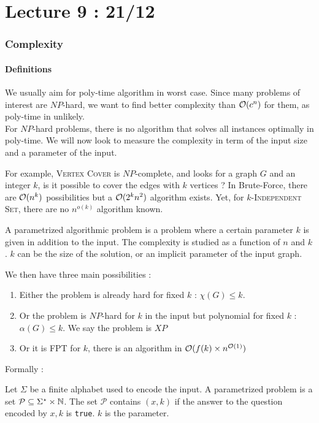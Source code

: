 \documentclass[12pt]{cours}
\begin{document}
\part[Parametrized Complexity]{Lecture 9 : 21/12}
\section{Complexity}
\subsection{Definitions}
We usually aim for poly-time algorithm in worst case. Since many problems of interest are $NP$-hard, we want to find better complexity than $\mathcal{O}(c^{n})$ for them, as poly-time in unlikely. \\
For $NP$-hard problems, there is no algorithm that solves all instances optimally in poly-time. We will now look to measure the complexity in term of the input size and a parameter of the input.

For example, \textsc{Vertex Cover} is $NP$-complete, and looks for a graph $G$ and an integer $k$, is it possible to cover the edges with $k$ vertices ? In Brute-Force, there are $\mathcal{O}(n^{k})$ possibilities but a $\mathcal{O}(2^{k}n^{2})$ algorithm exists. Yet, for $k$-\textsc{Independent Set}, there are no $n^{o(k)}$ algorithm known.

\begin{definition}
    A parametrized algorithmic problem is a problem where a certain parameter $k$ is given in addition to the input. The complexity is studied as a function of $n$ and $k$. $k$ can be the size of the solution, or an implicit parameter of the input graph.
\end{definition}

We then have three main possibilities :
\begin{enumerate}
    \item Either the problem is already hard for fixed $k$ : $\chi(G) \leq k$.
    \item Or the problem is $NP$-hard for $k$ in the input but polynomial for fixed $k$ : $\alpha(G) \leq k$. We say the problem is $XP$
    \item Or it is FPT for $k$, there is an algorithm in $\mathcal{O}(f(k)\times n^{\mathcal{O}(1)})$
\end{enumerate}

Formally :
\begin{definition}
    Let $\Sigma$ be a finite alphabet used to encode the input. A parametrized problem is a set $\mathcal{P} \subseteq \Sigma^{\star} \times \mathbb{N}$. The set $\mathcal{P}$ contains $(x, k)$ if the answer to the question encoded by $x, k$ is \texttt{true}. $k$ is the parameter.
\end{definition}
\end{document}

